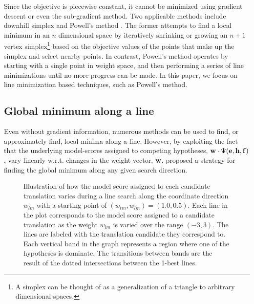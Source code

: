 \documentclass[11pt]{article}
\begin{document}
Since the objective is piecewise constant, it cannot be minimized using gradient descent or even the sub-gradient method. Two applicable methods include downhill simplex and Powell's method \cite{press2007}. The former attempts to find a local minimum in an $n$ dimensional space by iteratively shrinking or growing an $n+1$ vertex simplex\footnote{A simplex can be thought of as a generalization of a triangle to arbitrary dimensional spaces.} based on the objective values of the points that make up the simplex and select nearby points.	In contrast, Powell's method operates by starting with a single point in weight space, and then performing a series of line minimizations until no more progress can be made. In this paper, we focus on line minimization based techniques, such as Powell's method.  

\subsection{Global minimum along a line}

Even without gradient information, numerous methods can be used to find, or approximately find, local minima along a line. However, by exploiting the fact that the underlying model-scores assigned to competing hypotheses,  ${\bf w} \cdot \Psi({\bf e}, {\bf h}, {\bf f})$, vary linearly w.r.t. changes in the weight vector, ${\bf w}$,  proposed a strategy for finding the global minimum along any given search direction. 

\begin{figure}[h]
\vskip 0.2in
\begin{center}
\setlength{\epsfxsize}{3.0in}
\centerline{}
\vskip -0.15in
\caption{Illustration of how the model score assigned to each candidate translation varies during a line search along the coordinate direction $w_{lm}$ with a starting point of $(w_{tm}, w_{lm}) = (1.0, 0.5)$. Each line in the plot corresponds to the model score assigned to a candidate translation as the weight $w_{lm}$ is varied over the range $(-3,3)$.  The lines are labeled with the translation candidate they correspond to. Each vertical band in the graph represents a region where one of the hypotheses is dominate. The transitions between bands are the result of the dotted intersections between the 1-best lines.
\label{mertlinesearch}
}
\end{center}
\vskip -0.2in
\end{figure}
\end{document}
